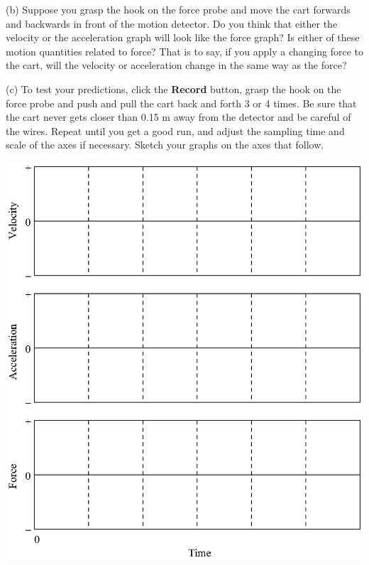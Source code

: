 
\newpage
(b) Suppose you grasp the hook on the force probe and move the cart forwards
and backwards in front of the motion detector. Do you think that either the
velocity or the acceleration graph will look like the force graph? Is either
of these motion quantities related to force? That is to say, if you apply a
changing force to the cart, will the velocity or acceleration change in the
same way as the force?
\answerspace{10mm}

\pagebreak[3]
(c) To test your predictions, click the \textbf{Record} button, grasp the
hook on the force probe and push and pull the cart back and forth 3 or 4 times. Be sure that
the cart never gets closer than 0.15 m away from the detector and be careful
of the wires. Repeat until you get a good run, and adjust the sampling time
and scale of the axes if necessary. Sketch your graphs on the axes that follow.

\vspace{-0.3cm}
{\par\centering \includegraphics[scale=0.95]{force1/force1_fig2.eps} \par}
\vspace{-0.4cm}

